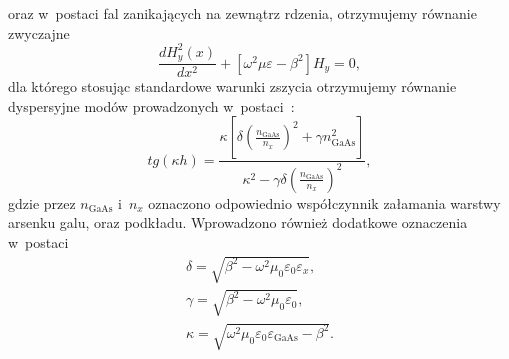 oraz w~postaci fal zanikających na zewnątrz rdzenia, otrzymujemy równanie zwyczajne
\begin{equation}
	\frac{d H_y^2(x)}{dx^2} + [ \omega^2 \mu \varepsilon - \beta^2 ] H_y = 0,
\end{equation}
dla którego stosując standardowe warunki zszycia otrzymujemy równanie dyspersyjne modów prowadzonych w~postaci~\cite{petykiewicz1989podstawy}:
\begin{equation}
tg( \kappa h)=\frac{\kappa [ \delta (\frac{n_{\textrm{GaAs}}}{n_x})^2 + \gamma n_{\textrm{GaAs}}^2 ]}{\kappa^2 - \gamma \delta (\frac{n_{\textrm{GaAs}}}{n_x })^2},
\label{eq:tm-disp}
\end{equation}
gdzie przez $n_{\textrm{GaAs}}$ i~$n_x$ oznaczono odpowiednio współczynnik załamania warstwy arsenku galu, oraz podkładu. Wprowadzono również dodatkowe oznaczenia w~postaci
\begin{equation}
	\begin{gathered}
		\delta=\sqrt{\beta^2-\omega^2 \mu_0 \varepsilon_0 \varepsilon_x},\\
		\gamma=\sqrt{\beta^2-\omega^2 \mu_0 \varepsilon_0},\\
		\kappa=\sqrt{\omega^2 \mu_0 \varepsilon_0 \varepsilon_{\textrm{GaAs}} - \beta^2}.
	\end{gathered}
\end{equation}

